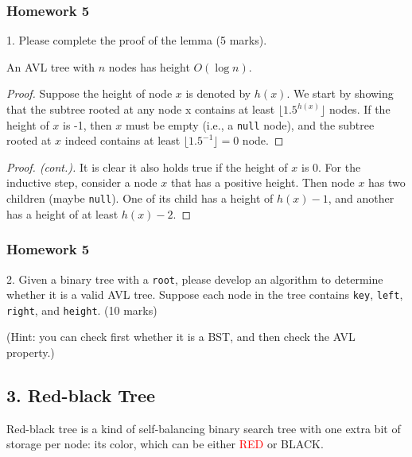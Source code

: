\documentclass[aspectratio=169, 14pt]{beamer}
\begin{document}
\begin{frame}
	\frametitle{Homework 5}
	1. Please complete the proof of the lemma (5 marks).
	\begin{lemma}
		An AVL tree with $n$ nodes has height $O(\log{n})$.
	\end{lemma}
	\begin{proof}
		Suppose the height of node $x$ is denoted by $h(x)$. We start by showing that \alert{the subtree rooted at any node x contains at least $\lfloor 1.5^{h(x)} \rfloor$ nodes}. If the height of $x$ is -1, then $x$ must be empty (i.e., a \texttt{null} node), and the subtree rooted at $x$ indeed contains at least $\lfloor 1.5^{-1} \rfloor = 0$ node.
	\end{proof}
\end{frame}

\begin{frame}
	\begin{proof}[Proof. (cont.)]
		It is clear it also holds true if the height of $x$ is 0. For the inductive step, consider a node $x$ that has a positive height. Then node $x$ has two children (maybe \texttt{null}). One of its child has a height of $h(x)-1$, and another has a height of at least $h(x) - 2$.

	\end{proof}
\end{frame}

\begin{frame}
	\frametitle{Homework 5}
	2. Given a binary tree with a \texttt{root}, please develop an algorithm to determine whether it is a valid AVL tree. Suppose each node in the tree contains \texttt{key}, \texttt{left}, \texttt{right}, and \texttt{height}. (10 marks)

	(\small{Hint: you can check first whether it is a BST, and then check the AVL property.})

\end{frame}

\begin{frame}

	\section{\textcolor{darkmidnightblue}{3. Red-black Tree}}
	Red-black tree is a kind of self-balancing binary search tree with one extra bit of storage per node: its color, which can be either \textcolor{red}{RED} or BLACK.
\end{frame}
\end{document}
